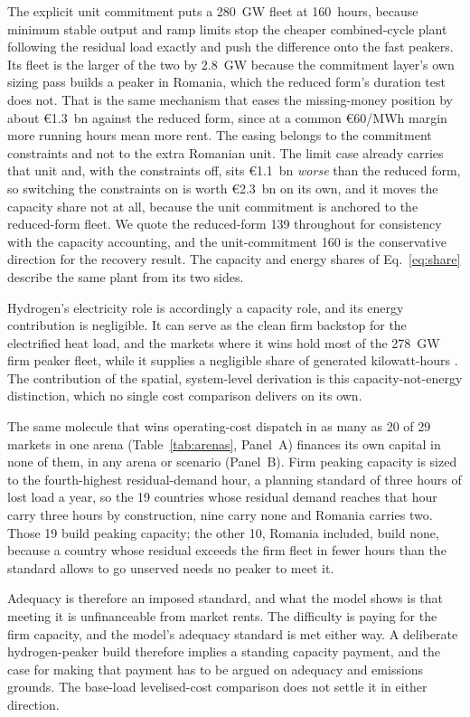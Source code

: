 The explicit unit commitment puts a 280~GW fleet at 160~hours, because minimum stable
output and ramp limits stop the cheaper combined-cycle plant following the residual load
exactly and push the difference onto the fast peakers. Its fleet is the larger of the
two by 2.8~GW because the commitment layer's own sizing pass builds a peaker in Romania,
which the reduced form's duration test does not. That is the same mechanism that eases the missing-money position by about \euro{}1.3~bn against the reduced form, since at a common \euro{}60/MWh margin more running hours mean more rent. The easing belongs to the commitment constraints and not to the extra Romanian unit. The limit case already carries that unit and, with the constraints off, sits \euro{}1.1~bn \emph{worse} than the reduced form, so switching the constraints on is worth \euro{}2.3~bn on its own, and it moves the capacity share not at all,
because the unit commitment is anchored to the reduced-form fleet. We quote the
reduced-form 139 throughout for consistency with the capacity accounting, and the
unit-commitment 160 is the conservative direction for the recovery result. The capacity and energy shares of
Eq.~\eqref{eq:share} describe the same plant from its two sides.

Hydrogen's electricity role is accordingly a capacity role, and its energy contribution is negligible. It can serve as the clean firm
backstop for the electrified heat load, and the markets where it wins hold most of
the 278~GW firm peaker fleet, while it supplies a negligible share of
generated kilowatt-hours
\citep{Bistline2020ValueOfTechnology}. The contribution of the spatial, system-level derivation is this capacity-not-energy distinction, which no single cost comparison delivers on its own.

The same molecule that wins operating-cost dispatch in as many as 20 of 29 markets in one arena (Table~\ref{tab:arenas}, Panel~A) finances its
own capital in none of them, in any arena or scenario (Panel~B). Firm peaking capacity
is sized to the fourth-highest residual-demand hour, a planning standard of three hours
of lost load a year, so the 19 countries whose residual demand reaches that hour
carry three hours by construction, nine carry none and Romania carries two. Those 19
build peaking capacity; the other 10, Romania included, build none, because a country whose residual exceeds
the firm fleet in fewer hours than the standard allows to go unserved needs no peaker
to meet it.

Adequacy is therefore an imposed standard, and what the model shows is that meeting it is
unfinanceable from market rents. The difficulty is paying for the firm capacity, and the model's adequacy standard is met either way. A deliberate hydrogen-peaker build therefore implies a standing capacity
payment, and the case for making that payment has to be argued on adequacy and
emissions grounds. The base-load levelised-cost comparison does not settle it in
either direction.

